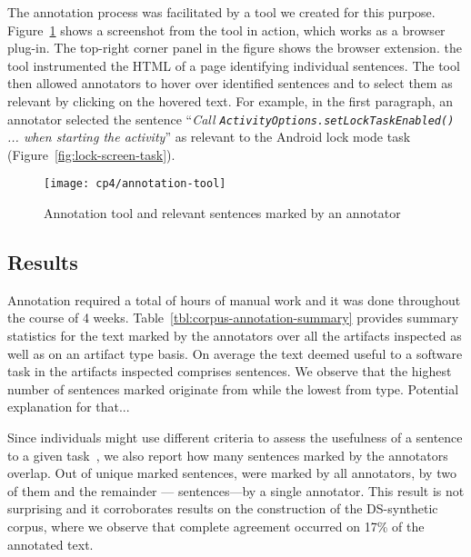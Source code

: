 The annotation process was facilitated by a tool we created for this purpose. Figure~\ref{fig:corpus-annotation-tool} shows a screenshot from the tool in 
action, which works as a browser plug-in. The top-right corner panel in the figure shows the browser extension. 
the tool instrumented the HTML of a page identifying individual sentences. The tool then allowed annotators to hover over identified sentences and to select them as relevant by clicking on the hovered text. For example, in the first paragraph, an annotator selected  the sentence
``\textit{Call {\small \texttt{ActivityOptions.setLockTaskEnabled()}} ... when starting the activity}'' as relevant to the Android lock mode task (Figure~\ref{fig:lock-screen-task}).







\begin{figure}
    \centering
    \texttt{[image: cp4/annotation-tool]}
    \caption{Annotation tool and relevant sentences marked by an annotator}
    \label{fig:corpus-annotation-tool}
\end{figure}




\subsection{Results}


Annotation required a total of  hours of manual work and it was done throughout the course of 4 weeks.
Table~\ref{tbl:corpus-annotation-summary} provides summary statistics for the text marked by 
the annotators over all the artifacts inspected as well as on an artifact type basis.
On average the text deemed useful to a software task in the artifacts inspected comprises 
 sentences. 
We observe that the highest number of sentences marked originate from 
while the lowest from  type. Potential explanation for that...











Since individuals might use different criteria to
assess the usefulness of a sentence to a given task~\cite{Barry1994, Barry1998, Freund2015},
we also report how many sentences marked by the annotators overlap.
Out of 
unique marked
sentences, 
 were marked by all annotators,
 by two of them and the remainder
--- sentences---by a single annotator.
This result is not surprising and it corroborates 
results on the construction of the \acs{DS-synthetic} 
corpus, where we observe that complete agreement 
occurred on 17\% of the annotated text.



\clearpage



\clearpage




